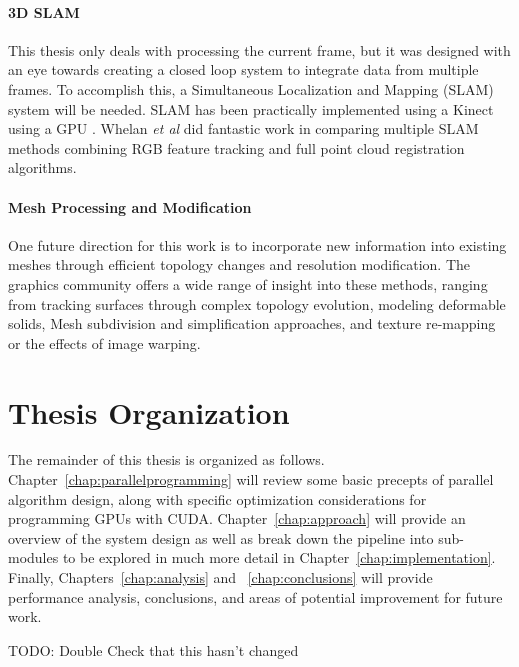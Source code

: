 \paragraph{3D SLAM}
This thesis only deals with processing the current frame, but it was designed with an eye towards creating a closed loop system to integrate data from multiple frames. To accomplish this, a Simultaneous Localization and Mapping (SLAM) system will be needed. SLAM has been practically implemented using a Kinect using a GPU \cite{quadrocopterslam,steinbrucker2011real}. Whelan \textit{et al} did fantastic work in comparing multiple SLAM methods combining RGB feature tracking and full point cloud registration algorithms\cite{whelan:odometry}.
\paragraph{Mesh Processing and Modification}
One future direction for this work is to incorporate new information into existing meshes through efficient topology changes and resolution modification. The graphics community offers a wide range of insight into these methods, ranging from tracking surfaces through complex topology evolution\cite{bojsen2012tracking}, modeling deformable solids\cite{Sifakis:2007:HSO}, Mesh subdivision and simplification approaches\cite{Puppo:2009:RS}, and texture re-mapping or the effects of image warping\cite{heckbert,heckbert:pixarsurvey,wang:optimaltexture,Oka:RealtimeManipulation,Guo:2008:MOR}.
\section{Thesis Organization} %
The remainder of this thesis is organized as follows. Chapter~\ref{chap:parallelprogramming} will review some basic precepts of parallel algorithm design, along with specific optimization considerations for programming GPUs with CUDA. Chapter~\ref{chap:approach} will provide an overview of the system design as well as break down the pipeline into sub-modules to be explored in much more detail in Chapter~\ref{chap:implementation}. Finally, Chapters~\ref{chap:analysis} and ~\ref{chap:conclusions} will provide performance analysis, conclusions, and areas of potential improvement for future work.\par
{\color{red} TODO: Double Check that this hasn't changed}